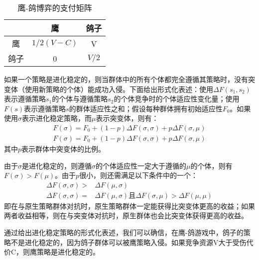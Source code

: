 \documentclass[twocolumn]{article}
\begin{document}
    \begin{table}
        \centering
        \begin{tabular}{c|cc}
            \hline
            & 鹰 & 鸽子 \\
            \hline
            鹰 & $1/2(V-C)$ & V \\
            鸽子 & 0 & $V/2$ \\
            \hline
        \end{tabular}
        \caption{鹰-鸽博弈的支付矩阵}
        \label{hawk-dove}
    \end{table}
    如果一个策略是进化稳定的，则当群体中的所有个体都完全遵循其策略时，没有突变体（使用新策略的个体）能成功入侵。下面给出形式化表述：使用$\Delta F(s_1, s_2)$表示遵循策略$s_1$的个体与遵循策略$s_2$的个体竞争时的个体适应性变化量；使用$F(s)$表示遵循策略$s$的群体适应性之和；假设每种群体拥有初始适应性$F_0$。如果使用$\sigma$表示进化稳定策略，而$\mu$表示突变体，则有：
    \begin{equation}
        \begin{split}
            F(\sigma)=F_0 + (1-p)\Delta F(\sigma, \sigma) + p\Delta F(\sigma, \mu)\\
            F(\sigma)=F_0 + (1-p)\Delta F(\sigma, \sigma) + p\Delta F(\sigma, \mu)
        \end{split}
    \end{equation}
    其中$p$表示群体中突变体的比例。

    由于$\sigma$是进化稳定的，则遵循$\sigma$的个体适应性一定大于遵循的$\mu$的个体，则有$F(\sigma)>F(\mu)$。由于$p$很小，则还需满足以下条件中的一个：
    \begin{equation}
        \begin{split}
            \Delta F(\sigma, \sigma)>&\Delta F(\mu, \sigma) \\
            \Delta F(\sigma, \sigma)=&\Delta F(\mu, \sigma) 且 \Delta F(\sigma, \mu)>\Delta F(\mu, \mu)
        \end{split}
    \end{equation}
    即在与原生策略群体对抗时，原生策略群体一定能获得比突变体更高的收益；如果两者收益相等，则在与突变体对抗时，原生群体也会比突变体获得更高的收益。

    通过给出进化稳定策略的形式化表述，我们可以确信，在鹰-鸽游戏中，鸽子的策略不是进化稳定的，因为鸽子群体可以被鹰策略入侵。如果竞争资源V大于受伤代价C，则鹰策略是进化稳定的。
\end{document}
